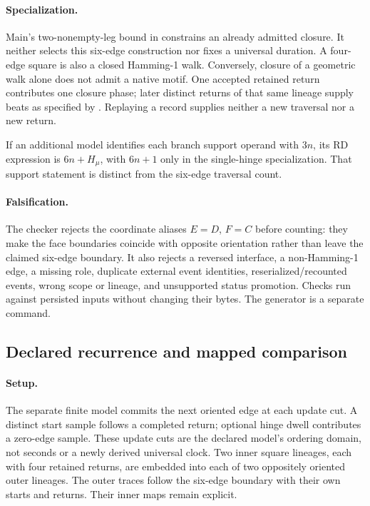 \paragraph{Specialization.}
Main's two-nonempty-leg bound in  constrains an already admitted closure. It neither selects this six-edge construction nor fixes a universal duration. A four-edge square is also a closed Hamming-1 walk. Conversely, closure of a geometric walk alone does not admit a native motif. One accepted retained return contributes one closure phase; later distinct returns of that same lineage supply beats as specified by . Replaying a record supplies neither a new traversal nor a new return.

If an additional model identifies each branch support operand with \(3n\), its RD expression is \(6n+H_\mu\), with \(6n+1\) only in the single-hinge specialization. That support statement is distinct from the six-edge traversal count.

\paragraph{Falsification.}
The checker rejects the coordinate aliases \(E=D\), \(F=C\) before counting: they make the face boundaries coincide with opposite orientation rather than leave the claimed six-edge boundary. It also rejects a reversed interface, a non-Hamming-1 edge, a missing role, duplicate external event identities, reserialized/recounted events, wrong scope or lineage, and unsupported status promotion. Checks run against persisted inputs without changing their bytes. The generator is a separate command.


\subsection{Declared recurrence and mapped comparison}\label{manual2:declared-recurrence}
\paragraph{Setup.}
The separate finite model commits the next oriented edge at each update cut. A distinct start sample follows a completed return; optional hinge dwell contributes a zero-edge sample. These update cuts are the declared model's ordering domain, not seconds or a newly derived universal clock. Two inner square lineages, each with four retained returns, are embedded into each of two oppositely oriented outer lineages. The outer traces follow the six-edge boundary with their own starts and returns. Their inner maps remain explicit.

